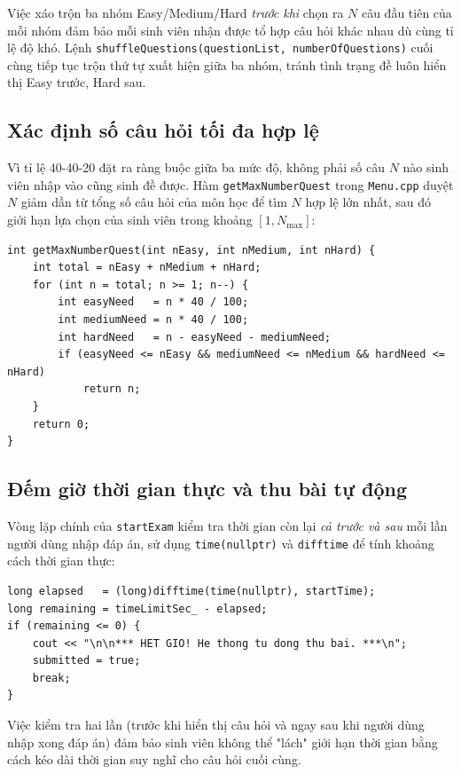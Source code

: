 \documentclass[11pt]{report}
\begin{document}
Việc xáo trộn ba nhóm Easy/Medium/Hard \textit{trước khi} chọn ra $N$ câu đầu tiên của mỗi nhóm đảm bảo mỗi sinh viên nhận được tổ hợp câu hỏi khác nhau dù cùng tỉ lệ độ khó. Lệnh \texttt{shuffleQuestions(questionList, numberOfQuestions)} cuối cùng tiếp tục trộn thứ tự xuất hiện giữa ba nhóm, tránh tình trạng đề luôn hiển thị Easy trước, Hard sau.

\subsection{Xác định số câu hỏi tối đa hợp lệ}

Vì tỉ lệ 40-40-20 đặt ra ràng buộc giữa ba mức độ, không phải số câu $N$ nào sinh viên nhập vào cũng sinh đề được. Hàm \texttt{getMaxNumberQuest} trong \texttt{Menu.cpp} duyệt $N$ giảm dần từ tổng số câu hỏi của môn học để tìm $N$ hợp lệ lớn nhất, sau đó giới hạn lựa chọn của sinh viên trong khoảng $[1, N_{\max}]$:

\begin{lstlisting}[caption={Tính số câu hỏi tối đa hợp lệ (Menu.cpp)}, label={lst:max_quest}]
int getMaxNumberQuest(int nEasy, int nMedium, int nHard) {
    int total = nEasy + nMedium + nHard;
    for (int n = total; n >= 1; n--) {
        int easyNeed   = n * 40 / 100;
        int mediumNeed = n * 40 / 100;
        int hardNeed   = n - easyNeed - mediumNeed;
        if (easyNeed <= nEasy && mediumNeed <= nMedium && hardNeed <= nHard)
            return n;
    }
    return 0;
}
\end{lstlisting}

\subsection{Đếm giờ thời gian thực và thu bài tự động}

Vòng lặp chính của \texttt{startExam} kiểm tra thời gian còn lại \textit{cả trước và sau} mỗi lần người dùng nhập đáp án, sử dụng \texttt{time(nullptr)} và \texttt{difftime} để tính khoảng cách thời gian thực:

\begin{lstlisting}[caption={Kiểm tra thời gian và thu bài tự động (Exam.cpp)}, label={lst:exam_timer}]
long elapsed   = (long)difftime(time(nullptr), startTime);
long remaining = timeLimitSec_ - elapsed;
if (remaining <= 0) {
    cout << "\n\n*** HET GIO! He thong tu dong thu bai. ***\n";
    submitted = true;
    break;
}
\end{lstlisting}

Việc kiểm tra hai lần (trước khi hiển thị câu hỏi và ngay sau khi người dùng nhập xong đáp án) đảm bảo sinh viên không thể "lách" giới hạn thời gian bằng cách kéo dài thời gian suy nghĩ cho câu hỏi cuối cùng.
\end{document}
